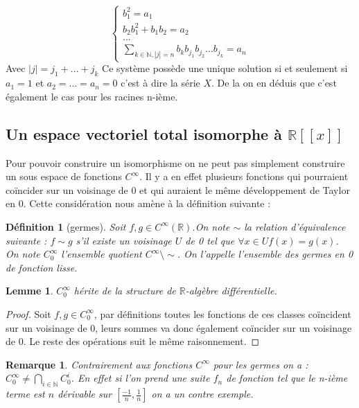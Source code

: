 \documentclass[12pt,a4paper]{amsart}
\newtheorem{lem}[thm]{\bf Lemme}
\newtheorem{defn}[thm]{\bf D\'efinition}
\newtheorem{rem}[thm]{Remarque}
\begin{document}
$$ \left\{
	\begin{array}{ll}
	b_{1}^{2}=a_{1} \\
	b_{2}b_{1}^{2}+b_{1}b_{2}=a_{2}\\
	...\\
	\sum_{k\in \mathbb{N},|j|=n}b_{k}b_{j_{1}}b_{j_{2}}...b_{j_{k}}=a_{n}
	\end{array}
\right.
$$
Avec $|j|=j_{1}+...+j_{k}$ Ce système possède une unique solution si et seulement si $a_{1}=1$ et $a_{2}=...=a_{n}=0$ c'est à dire la série $X$. De la on en déduis que c'est également le cas pour les racines n-ième. 

\subsection{Un espace vectoriel total isomorphe à $\mathbb R[[x]]$}
Pour pouvoir construire un isomorphisme on ne peut pas simplement construire un sous espace de fonctions $C^{\infty}$. Il y a en effet plusieurs fonctions qui pourraient coïncider sur un voisinage de 0 et qui auraient le même développement de Taylor en 0. Cette considération nous amène à la définition suivante : 

\begin{defn}[germes]
Soit $f,g \in C^{\infty}(\mathbb{R})$.On note $\sim$ la relation d'équivalence suivante : $f\sim g$ s'il existe un voisinage $U$ de 0 tel que $\forall x\in U f(x)=g(x)$. On note $C_{0}^{\infty}$ l'ensemble quotient $C^{\infty}\setminus\sim$. On l'appelle l'ensemble des germes en 0 de fonction lisse. 
\end{defn}

\begin{lem}
$C_{0}^{\infty}$ hérite de la structure de $\mathbb{R}$-algèbre différentielle. 

\end{lem} 

\begin{proof}
Soit $f,g\in C_{0}^{\infty}$, par définitions toutes les fonctions de ces classes coïncident sur un voisinage de 0, leurs sommes va donc également coïncider sur un voisinage de 0. Le reste des opérations suit le même raisonnement.  
\end{proof}

\begin{rem}
Contrairement aux fonctions $C^{\infty}$ pour les germes on a : $C^{\infty}_{0} \neq \bigcap_{i\in \mathbb{N}} C^{i}_{0}$. En effet si l'on prend une suite $f_{n}$ de fonction tel que le n-ième terme est $n$ dérivable sur $[\frac{-1}{n},\frac{1}{n}]$ on a un contre exemple.  
\end{rem}
\end{document}
